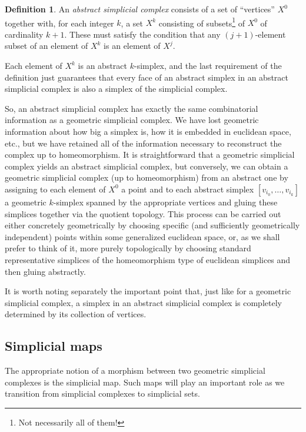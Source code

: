 \documentclass[12pt]{article}
\theoremstyle{plain}
\theoremstyle{definition}
\newtheorem{definition}[theorem]{Definition}
\theoremstyle{remark}
\begin{document}
\begin{definition}
An \emph{abstract simplicial complex} consists of a set of ``vertices'' $X^0$ together with, for each integer $k$, a set $X^k$ consisting of subsets\footnote{Not necessarily all of them!} of $X^0$ of cardinality $k+1$. These must satisfy the condition that any $(j+1)$-element subset of an element of $X^k$ is an element of $X^j$. 
\end{definition}

Each element of $X^k$ is an abstract $k$-simplex, and 
the last requirement of the definition just guarantees that every face of an abstract simplex in an abstract simplicial complex is also a simplex of the simplicial complex. 

So, an abstract simplicial complex has exactly the same combinatorial information as a geometric simplicial complex. We have lost geometric information about how big a simplex is, how it is embedded in euclidean space, etc., but we have retained all of the information necessary to reconstruct the complex up to homeomorphism.
 It is straightforward that a geometric simplicial complex yields an abstract simplicial complex, but conversely, we can obtain a geometric simplicial complex (up to homeomorphism) from an abstract one by assigning to each element of $X^0$ a point  and to each  abstract simplex $[v_{i_0},\ldots, v_{i_k}]$ a geometric $k$-simplex spanned by the appropriate vertices and gluing these simplices together via the quotient topology. This process can be carried out either concretely geometrically by choosing specific (and sufficiently geometrically independent) points within some generalized euclidean space, or, as we shall prefer to think of it,  more purely topologically by choosing standard representative simplices of the homeomorphism type of euclidean simplices and then gluing abstractly. 
 
It is worth noting separately the important point that, just like for a geometric simplicial complex, a simplex in an abstract simplicial complex is completely determined by its collection of vertices.





\subsection{Simplicial maps}

The appropriate notion of a morphism between two geometric simplicial complexes  is the simplicial map. Such maps will play an important role as we transition  from simplicial complexes to simplicial sets. 
\end{document}
